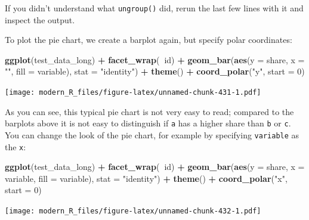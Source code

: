 \documentclass[]{gitbook}
\newenvironment{Shaded}{\begin{snugshade}}{\end{snugshade}}
\newcommand{\DataTypeTok}[1]{\textcolor[rgb]{0.13,0.29,0.53}{#1}}
\newcommand{\DecValTok}[1]{\textcolor[rgb]{0.00,0.00,0.81}{#1}}
\newcommand{\KeywordTok}[1]{\textcolor[rgb]{0.13,0.29,0.53}{\textbf{#1}}}
\newcommand{\NormalTok}[1]{#1}
\newcommand{\OperatorTok}[1]{\textcolor[rgb]{0.81,0.36,0.00}{\textbf{#1}}}
\newcommand{\StringTok}[1]{\textcolor[rgb]{0.31,0.60,0.02}{#1}}
\begin{document}
If you didn't understand what \texttt{ungroup()} did, rerun the last few lines with it and inspect the
output.

To plot the pie chart, we create a barplot again, but specify polar coordinates:

\begin{Shaded}
\begin{Highlighting}[]
\KeywordTok{ggplot}\NormalTok{(test_data_long) }\OperatorTok{+}
\StringTok{  }\KeywordTok{facet_wrap}\NormalTok{(}\OperatorTok{~}\NormalTok{id) }\OperatorTok{+}
\StringTok{  }\KeywordTok{geom_bar}\NormalTok{(}\KeywordTok{aes}\NormalTok{(}\DataTypeTok{y =}\NormalTok{ share, }\DataTypeTok{x =} \StringTok{""}\NormalTok{, }\DataTypeTok{fill =}\NormalTok{ variable), }\DataTypeTok{stat =} \StringTok{"identity"}\NormalTok{) }\OperatorTok{+}
\StringTok{  }\KeywordTok{theme}\NormalTok{() }\OperatorTok{+}
\StringTok{  }\KeywordTok{coord_polar}\NormalTok{(}\StringTok{"y"}\NormalTok{, }\DataTypeTok{start =} \DecValTok{0}\NormalTok{)}
\end{Highlighting}
\end{Shaded}

\texttt{[image: modern\_R\_files/figure-latex/unnamed-chunk-431-1.pdf]}

As you can see, this typical pie chart is not very easy to read; compared to the barplots above it
is not easy to distinguish if \texttt{a} has a higher share than \texttt{b} or \texttt{c}. You can change the look of the
pie chart, for example by specifying \texttt{variable} as the \texttt{x}:

\begin{Shaded}
\begin{Highlighting}[]
\KeywordTok{ggplot}\NormalTok{(test_data_long) }\OperatorTok{+}
\StringTok{  }\KeywordTok{facet_wrap}\NormalTok{(}\OperatorTok{~}\NormalTok{id) }\OperatorTok{+}
\StringTok{  }\KeywordTok{geom_bar}\NormalTok{(}\KeywordTok{aes}\NormalTok{(}\DataTypeTok{y =}\NormalTok{ share, }\DataTypeTok{x =}\NormalTok{ variable, }\DataTypeTok{fill =}\NormalTok{ variable), }\DataTypeTok{stat =} \StringTok{"identity"}\NormalTok{) }\OperatorTok{+}
\StringTok{  }\KeywordTok{theme}\NormalTok{() }\OperatorTok{+}
\StringTok{  }\KeywordTok{coord_polar}\NormalTok{(}\StringTok{"x"}\NormalTok{, }\DataTypeTok{start =} \DecValTok{0}\NormalTok{)}
\end{Highlighting}
\end{Shaded}

\texttt{[image: modern\_R\_files/figure-latex/unnamed-chunk-432-1.pdf]}
\end{document}
